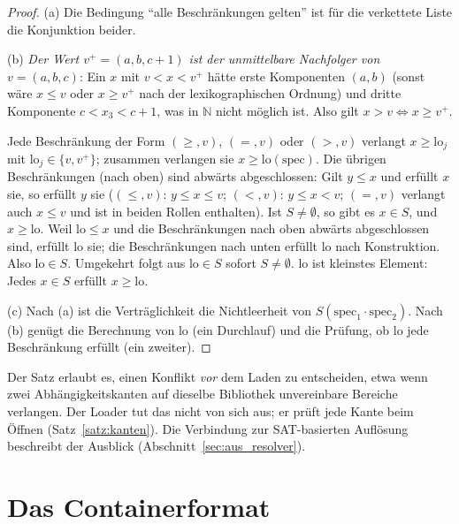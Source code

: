 \documentclass[a4paper,12pt,twoside]{report}
\DeclareRobustCommand{\_}{\ifmmode\mbox{\textunderscore}\else\textunderscore\allowbreak{}\fi}
\theoremstyle{definition}
\newcommand{\N}{\mathbb{N}}
\begin{document}
\begin{proof}
	(a) Die Bedingung ``alle Beschränkungen gelten'' ist für die verkettete Liste die Konjunktion beider.

	(b) \emph{Der Wert $v^+=(a,b,c+1)$ ist der unmittelbare Nachfolger von $v=(a,b,c)$}: Ein $x$ mit $v<x<v^+$ hätte erste Komponenten $(a,b)$ (sonst wäre $x\le v$ oder $x\ge v^+$ nach der lexikographischen Ordnung) und dritte Komponente $c<x_3<c+1$, was in $\N$ nicht möglich ist. Also gilt $x>v\iff x\ge v^+$.

	Jede Beschränkung der Form $(\ge,v)$, $(=,v)$ oder $(>,v)$ verlangt $x\ge\mathrm{lo}_j$ mit $\mathrm{lo}_j\in\{v,v^+\}$; zusammen verlangen sie $x\ge\mathrm{lo}(\mathrm{spec})$. Die übrigen Beschränkungen (nach oben) sind abwärts abgeschlossen: Gilt $y\le x$ und erfüllt $x$ sie, so erfüllt $y$ sie ($(\le,v)$: $y\le x\le v$; $(<,v)$: $y\le x<v$; $(=,v)$ verlangt auch $x\le v$ und ist in beiden Rollen enthalten). Ist $S\neq\emptyset$, so gibt es $x\in S$, und $x\ge\mathrm{lo}$. Weil $\mathrm{lo}\le x$ und die Beschränkungen nach oben abwärts abgeschlossen sind, erfüllt $\mathrm{lo}$ sie; die Beschränkungen nach unten erfüllt $\mathrm{lo}$ nach Konstruktion. Also $\mathrm{lo}\in S$. Umgekehrt folgt aus $\mathrm{lo}\in S$ sofort $S\ne\emptyset$. $\mathrm{lo}$ ist kleinstes Element: Jedes $x\in S$ erfüllt $x\ge\mathrm{lo}$.

	(c) Nach (a) ist die Verträglichkeit die Nichtleerheit von $S(\mathrm{spec}_1\cdot\mathrm{spec}_2)$. Nach (b) genügt die Berechnung von $\mathrm{lo}$ (ein Durchlauf) und die Prüfung, ob $\mathrm{lo}$ jede Beschränkung erfüllt (ein zweiter).
\end{proof}

Der Satz erlaubt es, einen Konflikt \emph{vor} dem Laden zu entscheiden, etwa wenn zwei Abhängigkeitskanten auf dieselbe Bibliothek unvereinbare Bereiche verlangen. Der Loader tut das nicht von sich aus; er prüft jede Kante beim Öffnen (Satz~\ref{satz:kanten}). Die Verbindung zur SAT-basierten Auflösung beschreibt der Ausblick (Abschnitt~\ref{sec:aus_resolver}).

\section{Das Containerformat}
\end{document}
